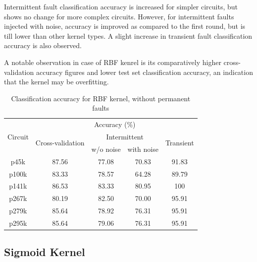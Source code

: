 Intermittent fault classification accuracy is increased for simpler circuits, but shows no change for more complex circuits. However, for intermittent faults injected with noise, accuracy is improved as compared to the first round, but is till lower than other kernel types. A slight increase in transient fault classification accuracy is also observed. 

A notable observation in case of RBF kenrel is its comparatively higher cross-validation accuracy figures and lower test set classification accuracy, an indication that the kernel may be overfitting.

\begin{table}[h]
	\captionsetup{justification=centering}
\begin{tabular}{ccccc}
\hline
\multirow{3}{*}{Circuit} & \multicolumn{4}{c}{Accuracy (\%)}                                                                 \\ \cline{2-5} 
                         & \multirow{2}{*}{Cross-validation} & \multicolumn{2}{c}{Intermittent} & \multirow{2}{*}{Transient} \\ \cline{3-4}
                         &                                   & w/o noise      & with noise      &                            \\ \hline
p45k                     & 87.56                             & 77.08          & 70.83           & 91.83                      \\
p100k                    & 83.33                             & 78.57          & 64.28           & 89.79                      \\
p141k                    & 86.53                             & 83.33          & 80.95           & 100                        \\
p267k                    & 80.19                             & 82.50          & 70.00           & 95.91                      \\
p279k                    & 85.64                             & 78.92          & 76.31           & 95.91                      \\
p295k                    & 85.64                             & 79.06          & 76.31           & 95.91  						  \\
\hline
\end{tabular}
\caption {Classification accuracy for RBF kernel, without permanent faults}
\label{tab:rbfwop}
\end{table}


\subsection{Sigmoid Kernel}

